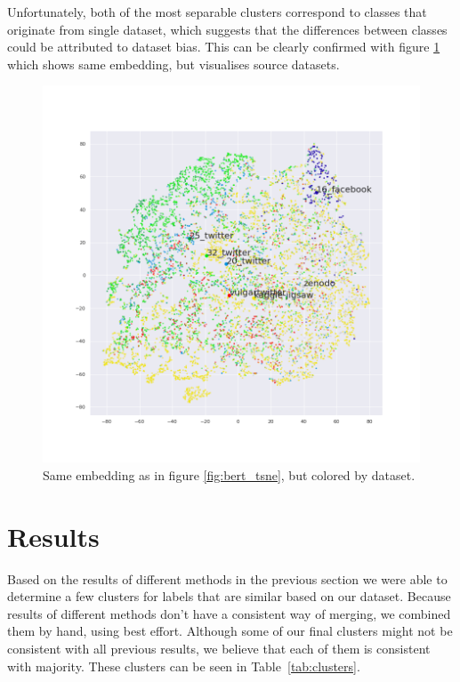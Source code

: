 \documentclass[fleqn,moreauthors,10pt]{ds_report}
\begin{document}
Unfortunately, both of the most separable clusters correspond to classes that originate from single dataset, which suggests that the differences between classes could be attributed to dataset bias. This can be clearly confirmed with figure \ref{fig:bert_tsne_source} which shows same embedding, but visualises source datasets.

\begin{figure}[h]
    \centering
    \includegraphics[width=\linewidth]{bert_source_embed_tsne.png}
    \caption{Same embedding as in figure \ref{fig:bert_tsne}, but colored by dataset.}
    \label{fig:bert_tsne_source}
\end{figure}

\section*{Results}

Based on the results of different methods in the previous section we were able to determine a few clusters for labels that are similar based on our dataset. Because results of different methods don't have a consistent way of merging, we combined them by hand, using best effort. Although some of our final clusters might not be consistent with all previous results, we believe that each of them is consistent with majority. These clusters can be seen in Table~\ref{tab:clusters}. 
\end{document}
